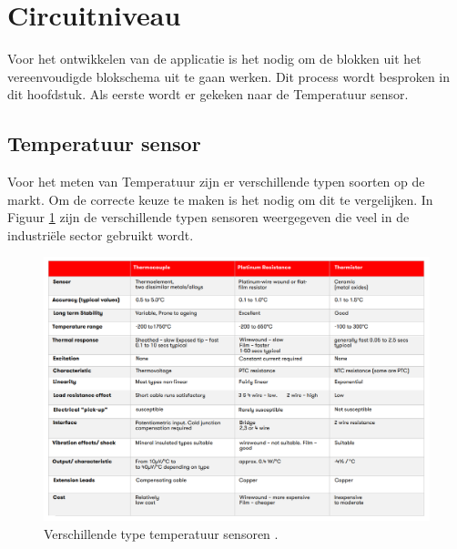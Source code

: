 \newpage
\section{Circuitniveau}
\label{Circuit_niveau}
Voor het ontwikkelen van de applicatie is het nodig om de blokken uit het vereenvoudigde blokschema uit te gaan werken. Dit process wordt besproken in dit hoofdstuk. Als eerste wordt er gekeken naar de Temperatuur sensor.

\subsection{Temperatuur sensor}
Voor het meten van Temperatuur zijn er verschillende typen soorten op de markt. Om de correcte keuze te maken is het nodig om dit te vergelijken. In Figuur \ref{fig:verschillende_temp_sensors} zijn de verschillende typen sensoren weergegeven die veel in de industriële sector gebruikt wordt.

\begin{figure}[H]
    \centering
    \includegraphics[width=1\linewidth]{pictures/RS_sensor_buyers_guide.png}
    \caption{Verschillende type temperatuur sensoren \cite{RS_temp_sensor}.}
    \label{fig:verschillende_temp_sensors}
\end{figure}

